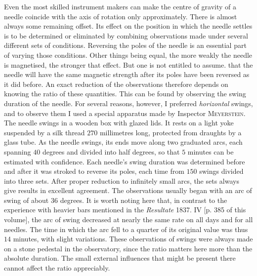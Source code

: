 Even the most skilled instrument makers can make the centre of gravity of a needle coincide with the axis of rotation only approximately. There is almost always some remaining offset. Its effect on the position in which the needle settles is to be determined or eliminated by combining observations made under several different sets of conditions. Reversing the poles of the needle is an essential part of varying those conditions. Other things being equal, the more weakly the needle is magnetised, the stronger that effect. But one is not entitled to assume. that the needle will have the same magnetic strength after its poles have been reversed as it did before. An exact reduction of the observations therefore depends on knowing the ratio of these quantities. This can be found by observing the swing duration of the needle. For several reasons, however, I preferred \textit{horizontal} swings, and to observe them I used a special apparatus made by Inspector \textsc{Meyerstein}. The needle swings in a wooden box with glazed lids. It rests on a light yoke suspended by a silk thread $270$ millimetres long, protected from draughts by a glass tube. As the needle swings, its ends move along two graduated arcs, each spanning $40$ degrees and divided into half degrees, so that $5$ minutes can be estimated with confidence. Each needle's swing duration was determined before and after it was stroked to reverse its poles, each time from $150$ swings divided into three sets. After proper reduction to infinitely small arcs, the sets always give results in excellent agreement. The observations usually began with an arc of swing of about $36$ degrees. It is worth noting here that, in contrast to the experience with heavier bars mentioned in the \textit{Resultate} 1837. IV [p. 385 of this volume], the arc of swing decreased at nearly the same rate on all days and for all needles. The time in which the arc fell to a quarter of its original value was thus $14$ minutes, with slight variations. These observations of swings were always made on a stone pedestal in the observatory, since the ratio matters here more than the absolute duration. The small external influences that might be present there cannot affect the ratio appreciably.

